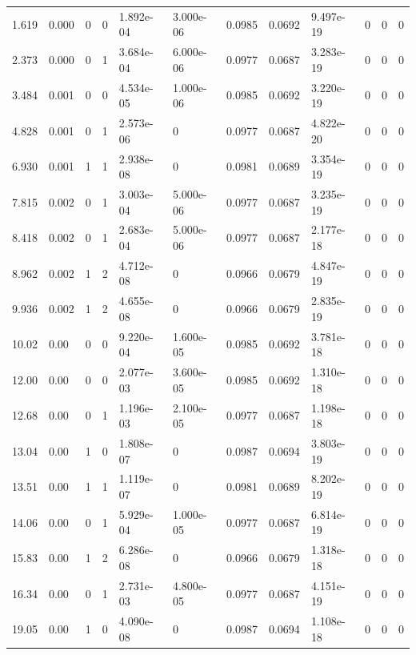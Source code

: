 \documentclass[preview]{standalone}
\begin{document}
{{\begin{tabular}{L{1.2cm}C{1.2cm} C{0.3cm}C{0.5cm} C{1.4cm}C{1.4cm} C{1.4cm}C{1.4cm} C{1.6cm}C{1.6cm} C{1.6cm}C{1.6cm}}
  1.619  &  0.000  & 0     &  0 &  1.892e-04  & 3.000e-06  &  0.0985&   0.0692& 9.497e-19 & 0   &  0 & 0  \\ 
  2.373  &  0.000  & 0     &  1 &  3.684e-04  & 6.000e-06  &  0.0977&   0.0687& 3.283e-19 & 0   &  0 & 0  \\ 
  3.484  &  0.001  & 0     &  0 &  4.534e-05  & 1.000e-06  &  0.0985&   0.0692& 3.220e-19 & 0   &  0 & 0  \\ 
  4.828  &  0.001  & 0     &  1 &  2.573e-06  & 0  &  0.0977&   0.0687& 4.822e-20 & 0   &  0 & 0  \\ 
  6.930  &  0.001  & 1     &  1 &  2.938e-08  & 0  &  0.0981&   0.0689& 3.354e-19 & 0   &  0 & 0  \\ 
  7.815  &  0.002  & 0     &  1 &  3.003e-04  & 5.000e-06  &  0.0977&   0.0687& 3.235e-19 & 0   &  0 & 0  \\ 
  8.418  &  0.002  & 0     &  1 &  2.683e-04  & 5.000e-06  &  0.0977&   0.0687& 2.177e-18 & 0   &  0 & 0  \\ 
  8.962  &  0.002  & 1     &  2 &  4.712e-08  & 0  &  0.0966&   0.0679& 4.847e-19 & 0   &  0 & 0  \\ 
  9.936  &  0.002  & 1     &  2 &  4.655e-08  & 0  &  0.0966&   0.0679& 2.835e-19 & 0   &  0 & 0  \\ 
  10.02  &  0.00  & 0     &  0 &  9.220e-04  & 1.600e-05  &  0.0985&   0.0692& 3.781e-18 & 0   &  0 & 0  \\ 
  12.00  &  0.00  & 0     &  0 &  2.077e-03  & 3.600e-05  &  0.0985&   0.0692& 1.310e-18 & 0   &  0 & 0  \\ 
  12.68  &  0.00  & 0     &  1 &  1.196e-03  & 2.100e-05  &  0.0977&   0.0687& 1.198e-18 & 0   &  0 & 0  \\ 
  13.04  &  0.00  & 1     &  0 &  1.808e-07  & 0  &  0.0987&   0.0694& 3.803e-19 & 0   &  0 & 0  \\ 
  13.51  &  0.00  & 1     &  1 &  1.119e-07  & 0  &  0.0981&   0.0689& 8.202e-19 & 0   &  0 & 0  \\ 
  14.06  &  0.00  & 0     &  1 &  5.929e-04  & 1.000e-05  &  0.0977&   0.0687& 6.814e-19 & 0   &  0 & 0  \\ 
  15.83  &  0.00  & 1     &  2 &  6.286e-08  & 0  &  0.0966&   0.0679& 1.318e-18 & 0   &  0 & 0  \\ 
  16.34  &  0.00  & 0     &  1 &  2.731e-03  & 4.800e-05  &  0.0977&   0.0687& 4.151e-19 & 0   &  0 & 0  \\ 
  19.05  &  0.00  & 1     &  0 &  4.090e-08  & 0  &  0.0987&   0.0694& 1.108e-18 & 0   &  0 & 0  \\ 

\end{tabular}}}
\end{document}

